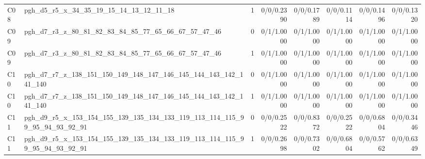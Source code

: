{\begin{tabular}{llrrrrrr}
C08 & pgh\_d5\_r5\_x\_34\_35\_19\_15\_14\_13\_12\_11\_18 & 1 & 0/0/0.2390 & 0/0/0.1789 & 0/0/0.1114 & 0/0/0.1496 & 0/0/0.1320 \\
C09 & pgh\_d7\_r3\_z\_80\_81\_82\_83\_84\_85\_77\_65\_66\_67\_57\_47\_46 & 0 & 0/1/1.0000 & 0/1/1.0000 & 0/1/1.0000 & 0/1/1.0000 & 0/1/1.0000 \\
C09 & pgh\_d7\_r3\_z\_80\_81\_82\_83\_84\_85\_77\_65\_66\_67\_57\_47\_46 & 1 & 0/1/1.0000 & 0/1/1.0000 & 0/1/1.0000 & 0/1/1.0000 & 0/1/1.0000 \\
C10 & pgh\_d7\_r7\_z\_138\_151\_150\_149\_148\_147\_146\_145\_144\_143\_142\_141\_140 & 0 & 0/1/1.0000 & 0/1/1.0000 & 0/1/1.0000 & 0/1/1.0000 & 0/1/1.0000 \\
C10 & pgh\_d7\_r7\_z\_138\_151\_150\_149\_148\_147\_146\_145\_144\_143\_142\_141\_140 & 1 & 0/1/1.0000 & 0/1/1.0000 & 0/1/1.0000 & 0/1/1.0000 & 0/1/1.0000 \\
C11 & pgh\_d9\_r5\_x\_153\_154\_155\_139\_135\_134\_133\_119\_113\_114\_115\_99\_95\_94\_93\_92\_91 & 0 & 0/0/0.2522 & 0/0/0.8372 & 0/0/0.2522 & 0/0/0.6804 & 0/0/0.3446 \\
C11 & pgh\_d9\_r5\_x\_153\_154\_155\_139\_135\_134\_133\_119\_113\_114\_115\_99\_95\_94\_93\_92\_91 & 1 & 0/0/0.2698 & 0/0/0.7302 & 0/0/0.6804 & 0/0/0.5762 & 0/0/0.6349 \\
\bottomrule
\end{tabular}
}
\par
